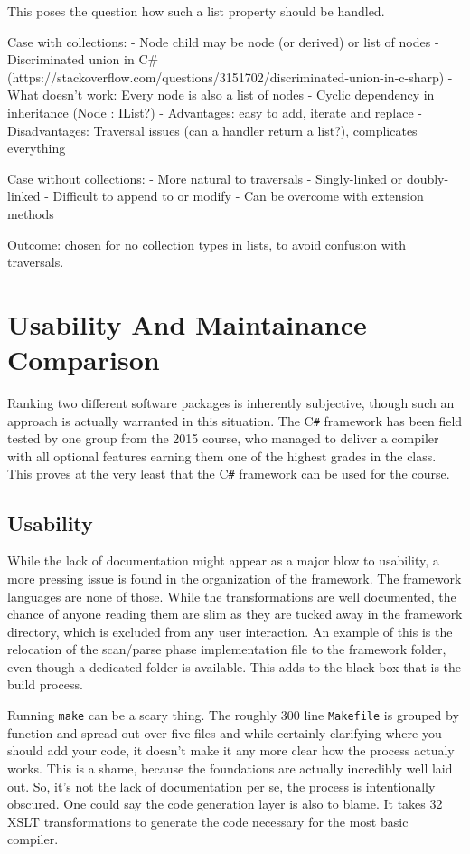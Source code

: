 \documentclass[twoside,openright]{uva-bachelor-thesis}
\newcommand{\code}[1]{\texttt{\footnotesize#1}}
\newcommand{\cs}{C\texttt{\#}\xspace}
\begin{document}
		This poses the question how such a list property should be handled. 
		
		Case with collections:
		- Node child may be node (or derived) or list of nodes
		- Discriminated union in C\# (https://stackoverflow.com/questions/3151702/discriminated-union-in-c-sharp)
		- What doesn't work: Every node is also a list of nodes
		- Cyclic dependency in inheritance (Node : IList?)
		- Advantages: easy to add, iterate and replace
		- Disadvantages: Traversal issues (can a handler return a list?), complicates everything
		
		Case without collections:
		- More natural to traversals
		- Singly-linked or doubly-linked
		- Difficult to append to or modify
		- Can be overcome with extension methods
		
		Outcome: chosen for no collection types in lists, to avoid confusion with traversals.
		
	

\chapter{Usability And Maintainance Comparison}
	Ranking two different software packages is inherently subjective, though such an approach is actually warranted in this situation. The \cs framework has been field tested by one group from the 2015 course, who managed to deliver a compiler with all optional features earning them one of the highest grades in the class. This proves at the very least that the \cs framework can be used for the course.
	
	\section{Usability}
		While the lack of documentation might appear as a major blow to usability, a more pressing issue is found in the organization of the framework. The framework languages are none of those. While the transformations are well documented, the chance of anyone reading them are slim as they are tucked away in the framework directory, which is excluded from any user interaction. An example of this is the relocation of the scan/parse phase implementation file to the framework folder, even though a dedicated folder is available. This adds to the black box that is the build process.
		
		Running \code{make} can be a scary thing. The roughly 300 line \code{Makefile} is grouped by function and spread out over five files and while certainly clarifying where you should add your code, it doesn't make it any more clear how the process actualy works. This is a shame, because the foundations are actually incredibly well laid out. So, it's not the lack of documentation per se, the process is intentionally obscured. One could say the code generation layer is also to blame. It takes 32 XSLT transformations to generate the code necessary for the most basic compiler.
		
\end{document}
